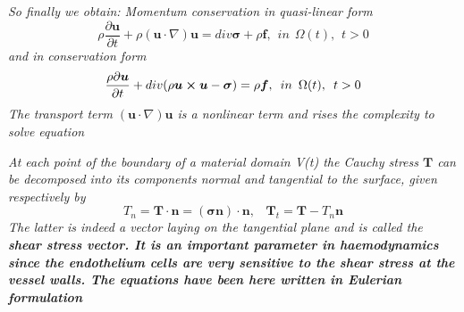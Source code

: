 \documentclass[11pt,letterpaper]{article}
\begin{document}
\textit{So finally we obtain: Momentum conservation in quasi-linear form
\begin{equation}
\rho  \frac{\partial \bm{u}}{\partial t} + \rho (\bm{u} \cdot \nabla) \bm{u} = div \bm{\sigma} + \rho\bm{f}, \hspace{5pt} in \hspace{5pt} \Omega(t), \hspace{5pt}t>0
\end{equation}
and in conservation form
\begin{equation}
 \frac{\rho \partial \bm{u}}{\partial t} + div(\rho \bm{u} \cross \bm{u}-\bm{\sigma}) =\rho\bm{f}, \hspace{5pt} in \hspace{5pt} \Omega(t), \hspace{5pt}t>0
\end{equation}
The transport term $(\bm{u} \cdot \nabla) \bm{u}$ is a nonlinear term and rises the complexity to solve equation
}

\textit{At each point of the boundary of a material domain V(t) the Cauchy
stress $\bm{T}$ can be decomposed into its components normal and tangential to the surface, given respectively by\begin{equation}
    T_n = \bm{T} \cdot \bm{n} = (\bm{\sigma} \bm{n}) \cdot \bm{n}, \hspace{10pt }\bm{T}_t = \bm{T}- T_n\bm{n}
\end{equation}
 The latter is indeed a vector laying on the tangential plane and is called
the \bf{shear stress vector}.
\textbf{It is an important parameter in haemodynamics since the endothelium cells are very sensitive to the shear stress at the vessel walls}. The equations
have been here written in Eulerian formulation
}
\end{document}
